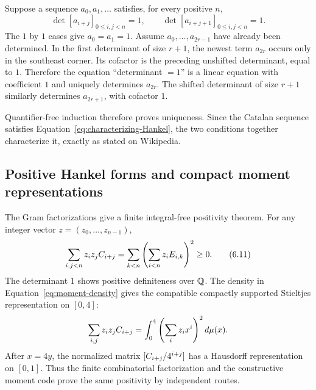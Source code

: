 Suppose a sequence $a_0,a_1,\ldots$ satisfies, for every positive $n$,
\[
 \det[a_{i+j}]_{0\le i,j<n}=1,
 \qquad
 \det[a_{i+j+1}]_{0\le i,j<n}=1.                                \tag{6.10}\label{eq:characterizing-Hankel}
\]
The $1$ by $1$ cases give $a_0=a_1=1$.  Assume $a_0,\ldots,a_{2r-1}$ have
already been determined.  In the first determinant of size $r+1$, the newest
term $a_{2r}$ occurs only in the southeast corner.  Its cofactor is the
preceding unshifted determinant, equal to $1$.  Therefore the equation
``determinant $=1$'' is a linear equation with coefficient $1$ and uniquely
determines $a_{2r}$.  The shifted determinant of size $r+1$ similarly
determines $a_{2r+1}$, with cofactor $1$.

Quantifier-free induction therefore proves uniqueness.  Since the Catalan
sequence satisfies Equation~\eqref{eq:characterizing-Hankel}, the two
conditions together characterize it, exactly as stated on Wikipedia.

\subsection{Positive Hankel forms and compact moment representations}

The Gram factorizations give a finite integral-free positivity theorem.  For
any integer vector $z=(z_0,\ldots,z_{n-1})$,
\[
 \sum_{i,j<n}z_iz_jC_{i+j}
 =\sum_{k<n}\left(\sum_{i<n}z_iE_{i,k}\right)^2\ge0.             \tag{6.11}
\]
The determinant $1$ shows positive definiteness over $\mathbb Q$.  The density in Equation~\eqref{eq:moment-density} gives the compatible
compactly supported Stieltjes representation on $[0,4]$:
\[
 \sum_{i,j}z_iz_jC_{i+j}
 =\int_0^4\left(\sum_i z_ix^i\right)^2d\mu(x).
\]
After $x=4y$, the normalized matrix
$[C_{i+j}/4^{i+j}]$ has a Hausdorff representation on $[0,1]$.
Thus the finite combinatorial factorization and the constructive moment code
prove the same positivity by independent routes.
